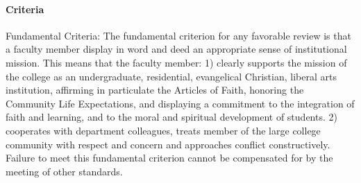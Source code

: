 \documentclass[letterpaper, 11pt]{article}
\begin{document}
			\paragraph{Criteria}
				Fundamental Criteria: The fundamental criterion for any favorable review is that a faculty member display in word and deed an appropriate sense of institutional mission. This means that the faculty member:
				1) clearly supports the mission of the college as an undergraduate, residential, evangelical Christian, liberal arts institution, affirming in particulate the Articles of Faith, honoring the Community Life Expectations, and displaying a commitment to the integration of faith and learning, and to the moral and spiritual development of students.
				2) cooperates with department colleagues, treats member of the large college community with respect and concern and approaches conflict constructively.
				Failure to meet this fundamental criterion cannot be compensated for by the meeting of other standards.
\end{document}
